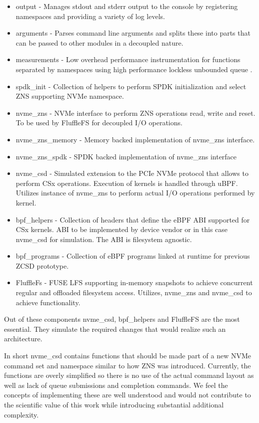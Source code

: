 \begin{itemize}
    \item output - Manages stdout and stderr output to the console by
    registering namespaces and providing a variety of log levels.
    \item arguments - Parses command line arguments and splits these into parts
    that can be passed to other modules in a decoupled nature. 
    \item measurements - Low overhead performance instrumentation for functions
    separated by namespaces using high performance lockless unbounded queue
    \cite{Michael1996SimpleFA}.
    \item spdk\_init - Collection of helpers to perform SPDK initialization and
    select ZNS supporting NVMe namespace.
    \item nvme\_zns - NVMe interface to perform ZNS operations read, write and
    reset. To be used by FluffleFS for decoupled I/O operations.
    \item nvme\_zns\_memory - Memory backed implementation of nvme\_zns
    interface.
    \item nvme\_zns\_spdk - SPDK backed implementation of nvme\_zns interface
    \item nvme\_csd - Simulated extension to the PCIe NVMe protocol that allows
    to perform CSx operations. Execution of kernels is handled through uBPF.
    Utilizes instance of nvme\_zns to perform actual I/O operations performed by
    kernel.
    \item bpf\_helpers - Collection of headers that define the eBPF ABI
    supported for CSx kernels. ABI to be implemented by device vendor
    or in this case nvme\_csd for simulation. The ABI is filesystem agnostic.
    \item bpf\_programs - Collection of eBPF programs linked at runtime for
    previous ZCSD \cite{lukken2021zcsd} prototype.
    \item FluffleFs - FUSE LFS supporting in-memory snapshots to achieve
    concurrent regular and offloaded filesystem access. Utilizes, nvme\_zns and
    nvme\_csd to achieve functionality.
\end{itemize}

Out of these components nvme\_csd, bpf\_helpers and FluffleFS are the most
essential. They simulate the required changes that would realize such an
architecture.

In short nvme\_csd contains functions that should be made part of a new NVMe
command set and namespace \cite{nvme-command} similar to how ZNS was introduced.
Currently, the functions are overly simplified so there is no use of the actual
command layout as well as lack of queue submissions and completion commands. We
feel the concepts of implementing these are well understood and would not
contribute to the scientific value of this work while introducing substantial
additional complexity.

